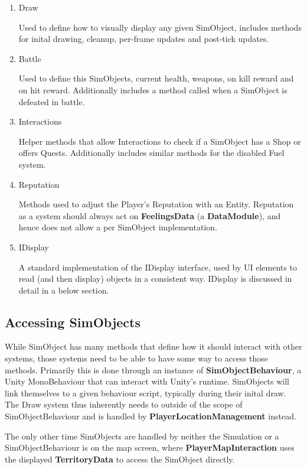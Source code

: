 \documentclass{report}
\begin{document}
\begin{enumerate}
        \item Draw

Used to define how to visually display any given SimObject, includes methods for inital drawing, cleanup, per-frame updates and post-tick updates.

        \item Battle

Used to define this SimObjects, current health, weapons, on kill reward and on hit reward. Additionally includes a method called when a SimObject is defeated in battle.

        \item Interactions

Helper methods that allow Interactions to check if a SimObject has a Shop or offers Quests. Additionally includes similar methods for the disabled Fuel system.

        \item Reputation

Methods used to adjust the Player's Reputation with an Entity. Reputation as a system should always act on \textbf{FeelingsData} (a \textbf{DataModule}), and hence does not allow a per SimObject implementation. 

	\item IDisplay

A standard implementation of the IDisplay interface, used by UI elements to read (and then display) objects in a consistent way. IDisplay is discussed in detail in a below section.

\end{enumerate}

\subsection{Accessing SimObjects}

While SimObject has many methods that define how it should interact with other systems, those systems need to be able to have some way to access those methods. Primarily this is done through an instance of \textbf{SimObjectBehaviour}, a Unity MonoBehaviour that can interact with Unity's runtime. SimObjects will link themselves to a given behaviour script, typically during their inital draw. The Draw system thus inherently needs to outside of the scope of SimObjectBehaviour and is handled by \textbf{PlayerLocationManagement} instead.

The only other time SimObjects are handled by neither the Simulation or a SimObjectBehaviour is on the map screen, where \textbf{PlayerMapInteraction} uses the displayed \textbf{TerritoryData} to access the SimObject directly.
\end{document}
